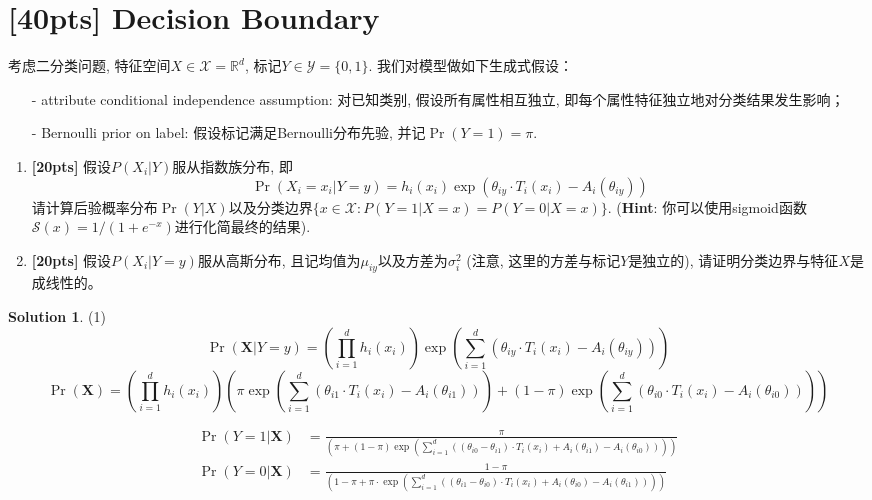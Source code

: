 \documentclass[a4paper,UTF8]{article}
\numberwithin{equation}{section}
\theoremstyle{definition}
\newtheorem*{solution}{Solution}
\begin{document}
\newpage
\section{[40pts] Decision Boundary}
考虑二分类问题, 特征空间$X \in \mathcal{X}= \mathbb{R}^d$, 标记$Y \in \mathcal{Y}= \{0, 1\}$. 我们对模型做如下生成式假设：
\begin{itemize}
\item[-] attribute conditional independence assumption: 对已知类别, 假设所有属性相互独立, 即每个属性特征独立地对分类结果发生影响；
\item[-] Bernoulli prior on label: 假设标记满足Bernoulli分布先验, 并记$\Pr(Y=1) = \pi$. 
\end{itemize}

\begin{enumerate}[(1)]
\item \textbf{[20pts]} 假设$P(X_i | Y)$服从指数族分布, 即
\[
\Pr(X_i = x_i | Y = y) = h_i(x_i) \exp (\theta_{iy} \cdot T_i(x_i) - A_{i}(\theta_{iy}))
\]
请计算后验概率分布$\Pr(Y | X)$以及分类边界$\{x \in \mathcal{X}: P(Y=1 | X = x) = P(Y=0 | X =x)\}$. (\textbf{Hint}: 你可以使用sigmoid函数$\mathcal{S}(x)=1/(1+e^{-x})$进行化简最终的结果).

\item \textbf{[20pts]} 假设$P(X_i | Y=y)$服从高斯分布, 且记均值为$\mu_{iy}$以及方差为$\sigma_{i}^2$ (注意, 这里的方差与标记$Y$是独立的), 请证明分类边界与特征$X$是成线性的。 
\end{enumerate}
\begin{solution}
(1) %
\begin{equation}
\Pr(\mathbf{X} | Y = y) = (\prod_{i=1}^d h_i(x_i)) \exp (\sum_{i=1}^d( \theta_{iy} \cdot T_i(x_i) - A_{i}(\theta_{iy})))
\end{equation}
\begin{equation}
\Pr(\mathbf{X}) = { (\prod_{i=1}^d h_i(x_i)) (\pi \exp (\sum_{i=1}^d( \theta_{i1} \cdot T_i(x_i) - A_{i}(\theta_{i1}))) +  (1-\pi) \exp (\sum_{i=1}^d( \theta_{i0} \cdot T_i(x_i) - A_{i}(\theta_{i0})))) }
\end{equation}

\begin{equation}
\begin{split}
\Pr(Y = 1 | \mathbf{X} ) &= \frac{\pi } { \left(\pi +  (1-\pi) \exp (\sum_{i=1}^d( (\theta_{i0} - \theta_{i1})\cdot T_i(x_i)  + A_{i}(\theta_{i1}) -A_{i}(\theta_{i0}))) \right) } \\
\Pr(Y = 0 | \mathbf{X} ) &= \frac{ 1 - \pi } { \left(1 - \pi +  \pi\cdot \exp (\sum_{i=1}^d( (\theta_{i1} - \theta_{i0})\cdot T_i(x_i)  + A_{i}(\theta_{i0}) -A_{i}(\theta_{i1}))) \right) }
\end{split}
\end{equation}
\end{solution}
\end{document}
